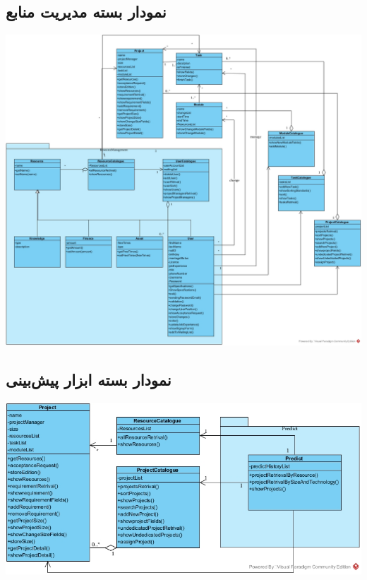 \newpage
\vspace{1cm}
\subsection{نمودار بسته مدیریت منابع}

\vspace{2cm}
\begin{center}
\includegraphics[width=\textwidth]{PackageDiagram/ResourcePackage.jpg}
\end{center}


\newpage
\vspace{1cm}
\subsection{نمودار بسته ابزار پیش‌بینی}

\vspace{2cm}
\begin{center}
\includegraphics[width=\textwidth]{PackageDiagram/PredictPackage.jpg}
\end{center}


